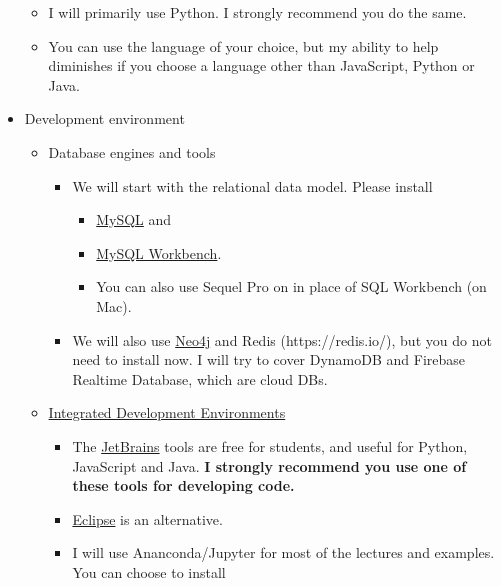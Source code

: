 \documentclass[11pt]{article}
\providecommand{\tightlist}{%
      \setlength{\itemsep}{0pt}\setlength{\parskip}{0pt}}
\begin{document}
\begin{itemize}
  \begin{itemize}
  \tightlist
  \item
    I will primarily use Python. I strongly recommend you do the same.
  \item
    You can use the language of your choice, but my ability to help
    diminishes if you choose a language other than JavaScript, Python or
    Java.
  \end{itemize}
\item
  Development environment

  \begin{itemize}
  \tightlist
  \item
    Database engines and tools

    \begin{itemize}
    \tightlist
    \item
      We will start with the relational data model. Please install

      \begin{itemize}
      \tightlist
      \item
        \href{https://dev.mysql.com/doc/refman/5.7/en/installing.html}{MySQL}
        and
      \item
        \href{https://dev.mysql.com/doc/workbench/en/wb-installing.html}{MySQL
        Workbench}.
      \item
        You can also use Sequel Pro on in place of SQL Workbench (on
        Mac).
      \end{itemize}
    \item
      We will also use \href{https://neo4j.com/}{Neo4j} and Redis
      (https://redis.io/), but you do not need to install now. I will
      try to cover DynamoDB and Firebase Realtime Database, which are
      cloud DBs.
    \end{itemize}
  \item
    \href{https://en.wikipedia.org/wiki/Integrated_development_environment}{Integrated
    Development Environments}

    \begin{itemize}
    \tightlist
    \item
      The \href{https://www.jetbrains.com/student/}{JetBrains} tools are
      free for students, and useful for Python, JavaScript and Java.
      \textbf{I strongly recommend you use one of these tools for
      developing code.}
    \item
      \href{https://www.eclipse.org/}{Eclipse} is an alternative.
    \item
      I will use Ananconda/Jupyter for most of the lectures and
      examples. You can choose to install


\end{itemize}
\end{itemize}
\end{itemize}
\end{document}
